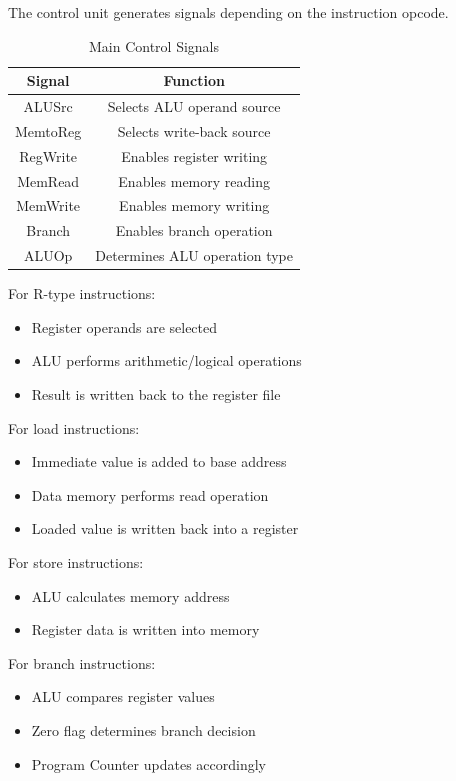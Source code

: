\documentclass[conference]{IEEEtran}
\begin{document}
The control unit generates signals depending on the instruction opcode.

\begin{table}[H]
\caption{Main Control Signals}
\centering
\begin{tabular}{|c|c|}
\hline
Signal & Function \\
\hline
ALUSrc & Selects ALU operand source \\
MemtoReg & Selects write-back source \\
RegWrite & Enables register writing \\
MemRead & Enables memory reading \\
MemWrite & Enables memory writing \\
Branch & Enables branch operation \\
ALUOp & Determines ALU operation type \\
\hline
\end{tabular}
\end{table}

For R-type instructions:
\begin{itemize}
    \item Register operands are selected
    \item ALU performs arithmetic/logical operations
    \item Result is written back to the register file
\end{itemize}

For load instructions:
\begin{itemize}
    \item Immediate value is added to base address
    \item Data memory performs read operation
    \item Loaded value is written back into a register
\end{itemize}

For store instructions:
\begin{itemize}
    \item ALU calculates memory address
    \item Register data is written into memory
\end{itemize}

For branch instructions:
\begin{itemize}
    \item ALU compares register values
    \item Zero flag determines branch decision
    \item Program Counter updates accordingly
\end{itemize}
\end{document}
